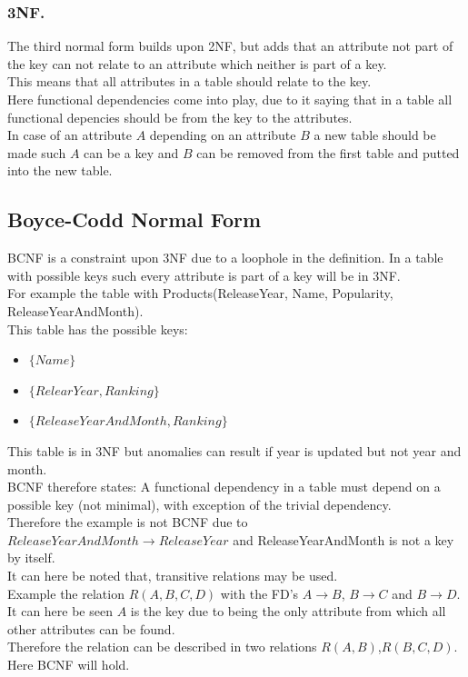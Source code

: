 \documentclass[12pt, a4paper]{article}
\begin{document}
			\subsubsection{3NF.}
				The third normal form builds upon 2NF, but adds that an attribute not part of the key can not relate to an attribute which neither is part of a key.\\
				This means that all attributes in a table should relate to the key.\\
				Here functional dependencies come into play, due to it saying that in a table all functional depencies should be from the key to the attributes.\\
				In case of an attribute $A$ depending on an attribute $B$ a new table should be made such $A$ can be a key and $B$ can be removed from the first table and putted into the new table. 			
		\subsection{Boyce-Codd Normal Form}
			BCNF is a constraint upon 3NF due to a loophole in the definition. In a table with possible keys such every attribute is part of a key will be in 3NF. \\
			For example the table with Products(ReleaseYear, Name, Popularity, ReleaseYearAndMonth).\\
			This table has the possible keys:
			\begin{itemize}
				\item $\{Name\}$
				\item $\{RelearYear, Ranking\}$
				\item $\{ReleaseYearAndMonth, Ranking\}$
			\end{itemize}
			This table is in 3NF but anomalies can result if year is updated but not year and month.\\[4mm]
			BCNF therefore states: A functional dependency in a table must depend on a possible key (not minimal), with exception of the trivial dependency.\\
			Therefore the example is not BCNF due to $ReleaseYearAndMonth \rightarrow ReleaseYear$ and ReleaseYearAndMonth is not a key by itself. \\[4mm]
			It can here be noted that, transitive relations may be used.\\
			Example the relation $R(A,B,C,D)$ with the FD's $A\rightarrow B$, $B\rightarrow C$ and $B\rightarrow D$.\\
			It can here be seen $A$ is the key due to being the only attribute from which all other attributes can be found.\\
			Therefore the relation can be described in two relations $R(A,B)$,$R(B,C,D)$. Here BCNF will hold.\\
\end{document}
